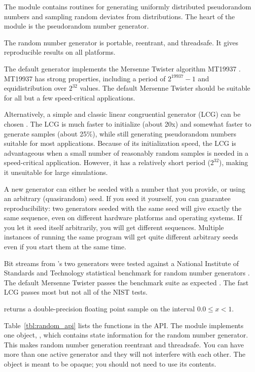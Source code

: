The  module contains routines for generating uniformly
distributed pseudorandom numbers and sampling random deviates from
distributions. The heart of the module is the 
pseudorandom number generator.

The  random number generator is portable,
reentrant, and threadsafe. It gives reproducible results on all
platforms.

The default  generator implements the Mersenne
Twister algorithm MT19937 \citep{Matsumoto98}. MT19937 has strong
properties, including a period of $2^{19937}-1$ and equidistribution
over $2^{32}$ values. The default Mersenne Twister should be suitable
for all but a few speed-critical applications.

Alternatively, a simple and classic linear congruential generator
(LCG) can be chosen \citep{Knu-81a}. The LCG is much faster to
initialize (about 20x) and somewhat faster to generate samples (about
25\%), while still generating pseudorandom numbers suitable for most
applications. Because of its initialization speed, the LCG is
advantageous when a small number of reasonably random samples is
needed in a speed-critical application. However, it has a relatively
short period ($2^32$), making it unsuitable for large simulations.

A new generator can either be seeded with a number that you provide,
or using an arbitrary (quasirandom) seed. If you seed it yourself, you
can guarantee reproducibility: two generators seeded with the same
seed will give exactly the same sequence, even on different hardware
platforms and operating systems. If you let it seed itself
arbitrarily, you will get different sequences. Multiple instances of
running the same program will get quite different arbitrary seeds even
if you start them at the same time.

Bit streams from 's two generators were tested
against a National Institute of Standards and Technology statistical
benchmark for random number generators \citep{NIST08}.  The default
Mersenne Twister passes the benchmark suite as expected
\citep{Matsumoto98}. The fast LCG passes most but not all of the NIST
tests.

 returns a double-precision floating point sample
on the interval $0.0 \leq x < 1$. 

Table~\ref{tbl:random_api} lists the functions in the 
API. The module implements one object, , which
contains state information for the random number generator.  This
makes random number generation reentrant and threadsafe. You can have
more than one active generator and they will not interfere with each
other. The object is meant to be opaque; you should not need to use
its contents.  





